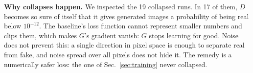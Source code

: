 \textbf{Why collapses happen.} We inspected the 19 collapsed runs. In 17 of them, $D$ becomes so sure of itself that it gives
generated images a probability of being real below $10^{-12}$. The baseline's loss function cannot represent smaller
numbers and clips them, which makes $G$'s gradient vanish: $G$ stops learning for good. Noise does not prevent this: a
single direction in pixel space is enough to separate real from fake, and noise spread over all pixels does not hide it.
The remedy is a numerically safer loss: the one of Sec.~\ref{sec:training} never collapsed.


